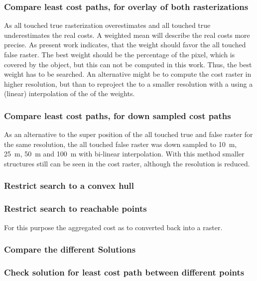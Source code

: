 \subsubsection{Compare least cost paths, for overlay of both rasterizations}
As all touched true rasterization overestimates and all touched true underestimates the real costs.
A weighted mean will describe the real costs more precise.
As present work indicates, that the weight should favor the all touched false raster.
The best weight should be the percentage of the pixel, which is covered by the object, but this can not be computed in this work.
Thus, the best weight has to be searched.
An alternative might be to compute the cost raster in higher resolution, but than to reproject the to a smaller resolution with a using a (linear) interpolation of the of the weights.
\subsubsection{Compare least cost paths, for down sampled cost paths}
As an alternative to the super position of the all touched true and false raster for the same resolution, the all touched false raster was down sampled to 10~m, 25~m, 50~m and 100~m with bi-linear interpolation.
With this method smaller structures still can be seen in the cost raster, although the resolution is reduced.

\subsubsection{Restrict search to a convex hull}
\subsubsection{Restrict search to reachable points}
For this purpose the aggregated cost as to converted back into a raster.

\subsubsection{Compare the different Solutions}
\subsubsection{Check solution for least cost path between different points}